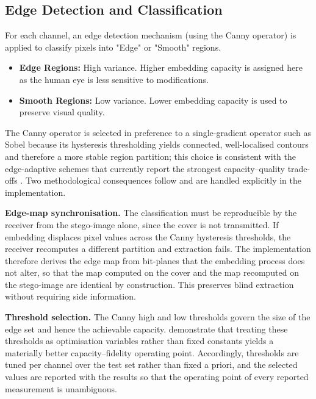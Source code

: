 \subsection{Edge Detection and Classification}
For each channel, an edge detection mechanism (using the Canny operator) is applied to classify pixels into "Edge" or "Smooth" regions.
\begin{itemize}
    \item \textbf{Edge Regions:} High variance. Higher embedding capacity is assigned here as the human eye is less sensitive to modifications.
    \item \textbf{Smooth Regions:} Low variance. Lower embedding capacity is used to preserve visual quality.
\end{itemize}

The Canny operator is selected in preference to a single-gradient operator such as Sobel because its hysteresis thresholding yields connected, well-localised contours and therefore a more stable region partition; this choice is consistent with the edge-adaptive schemes that currently report the strongest capacity--quality trade-offs \citep{ismail2026edgeadaptive, singh2026edgeopt}. Two methodological consequences follow and are handled explicitly in the implementation.

\textbf{Edge-map synchronisation.} The classification must be reproducible by the receiver from the stego-image alone, since the cover is not transmitted. If embedding displaces pixel values across the Canny hysteresis thresholds, the receiver recomputes a different partition and extraction fails. The implementation therefore derives the edge map from bit-planes that the embedding process does not alter, so that the map computed on the cover and the map recomputed on the stego-image are identical by construction. This preserves blind extraction without requiring side information.

\textbf{Threshold selection.} The Canny high and low thresholds govern the size of the edge set and hence the achievable capacity. \citet{singh2026edgeopt} demonstrate that treating these thresholds as optimisation variables rather than fixed constants yields a materially better capacity--fidelity operating point. Accordingly, thresholds are tuned per channel over the test set rather than fixed a priori, and the selected values are reported with the results so that the operating point of every reported measurement is unambiguous.

